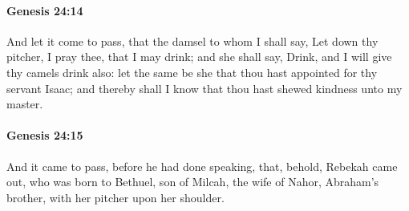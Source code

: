 		\paragraph{Genesis 24:14} %
			\label{GENESIS-24-14}

			And let it come to pass, that the damsel to whom I shall say, Let down thy pitcher, I pray thee, that I may drink; and she shall say, Drink, and I will give thy camels drink also: let the same be she that thou hast appointed for thy servant Isaac; and thereby shall I know that thou hast shewed kindness unto my master.


		\paragraph{Genesis 24:15} %
			\label{GENESIS-24-15}

			And it came to pass, before he had done speaking, that, behold, Rebekah came out, who was born to Bethuel, son of Milcah, the wife of Nahor, Abraham's brother, with her pitcher upon her shoulder.

